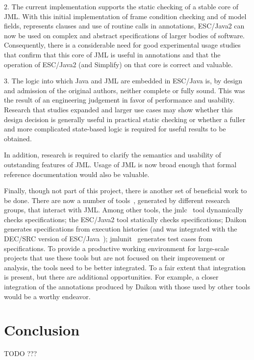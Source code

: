 \documentclass{acm_proc_article-sp}
\begin{document}
2. The current implementation supports the static checking of a
  stable core of JML.  With this initial implementation of frame
  condition checking and of model fields, represents clauses and use
  of routine calls in annotations, ESC/Java2 can now be used on
  complex and abstract specifications of larger bodies of software.
  Consequently, there is a considerable need for good experimental
  usage studies that confirm that this core of JML is useful in
  annotations and that the operation of ESC/Java2 (and Simplify) on
  that core is correct and valuable.

3. The logic into which Java and JML are embedded in ESC/Java is,
  by design and admission of the original authors, neither complete or
  fully sound.  This was the result of an engineering judgement in
  favor of performance and usability.  Research that studies expanded
  and larger use cases may show whether this design decision is
  generally useful in practical static checking or whether a fuller
  and more complicated state-based logic is required for useful
  results to be obtained.

In addition, research is required to clarify the semantics and usability of
  outstanding features of JML.  Usage of JML is now broad enough that
  formal reference documentation would also be valuable.

Finally, though not part of this project, there is another set of beneficial
work to be done.  There are now a number of tools~\cite{Burdy-etal03},
generated by different research groups, that interact with JML.  Among
other tools, the jmlc~\cite{Cheon-Leavens02b} tool dynamically checks
specifications; the ESC/Java2 tool statically checks specifications;
Daikon generates specifications from execution histories (and was
integrated with the DEC/SRC version of ESC/Java~\cite{NimmerErnst01});
jmlunit~\cite{Cheon-Leavens02} generates test cases from
specifications.  To provide a productive working environment for
large-scale projects that use these tools but are not focused on their
improvement or analysis, the tools need to be better integrated.  To a
fair extent that integration is present, but there are additional
opportunities.  For example, a closer integration of the annotations
produced by Daikon with those used by other tools would be a worthy
endeavor.

\section{Conclusion}
TODO ???
\end{document}

